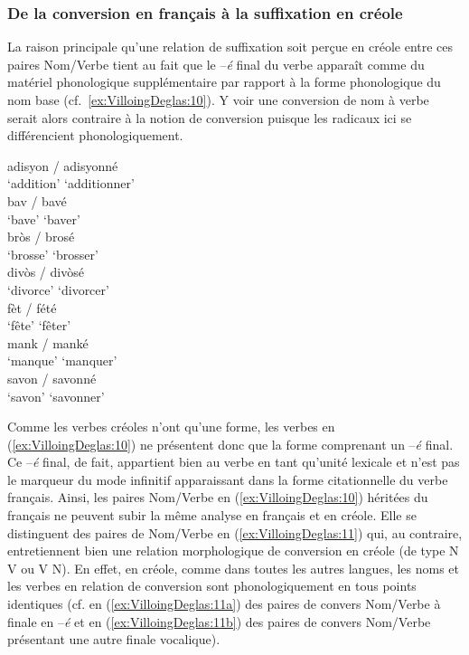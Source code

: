 \documentclass[output=paper]{langsci/langscibook}
\begin{document}
\subsubsection{De la conversion en français à la suffixation en
créole}\label{subsubsection:VilloingDeglas:de-la-conversion-en-français-uxe0-la-suffixation-en-créole}

La raison principale qu'une relation de suffixation soit perçue en
créole entre ces paires Nom/Verbe tient au fait que le --\emph{é}
final du verbe apparaît comme du matériel phonologique supplémentaire
par rapport à la forme phonologique du nom base (cf.~\ref{ex:VilloingDeglas:10}). Y voir une
conversion de nom à verbe serait alors contraire à la notion de
conversion puisque les radicaux ici se différencient phonologiquement.


\ea\label{ex:VilloingDeglas:10}
  \ea \gll adisyon / adisyonné\\
  {`addition'} {} {`additionner'}\\
  \ex \gll bav / bavé\\
  {`bave'} {} {`baver'}\\
  \ex \gll bròs / brosé\\
  {`brosse'} {} {`brosser'}\\
  \ex \gll divòs / divòsé\\
  {`divorce'} {} {`divorcer'}\\
  \ex \gll fèt / fété\\
  {`fête'} {} {`fêter'}\\
  \ex \gll mank / manké\\
  {`manque'} {} {`manquer'}\\
  \ex \gll savon / savonné\\
  {`savon'} {} {`savonner'}\\
\z\z

Comme les verbes créoles n'ont qu'une forme, les verbes en (\ref{ex:VilloingDeglas:10}) ne
présentent donc que la forme comprenant un --\emph{é} final. Ce
--\emph{é} final, de fait, appartient bien au verbe en tant qu'unité
lexicale et n'est pas le marqueur du mode infinitif apparaissant dans la
forme citationnelle du verbe français. Ainsi, les paires Nom/Verbe en
(\ref{ex:VilloingDeglas:10}) héritées du français ne peuvent subir la même analyse en français
et en créole. Elle se distinguent des paires de Nom/Verbe en (\ref{ex:VilloingDeglas:11}) qui,
au contraire, entretiennent bien une relation morphologique de
conversion en créole (de type N\textrightarrow{} V ou V\textrightarrow{} N). En effet, en créole, comme
dans toutes les autres langues, les noms et les verbes en relation de
conversion sont phonologiquement en tous points identiques (cf. en (\ref{ex:VilloingDeglas:11a})
des paires de convers Nom/Verbe à finale en --\emph{é} et en (\ref{ex:VilloingDeglas:11b}) des
paires de convers Nom/Verbe présentant une autre finale vocalique).
\end{document}

